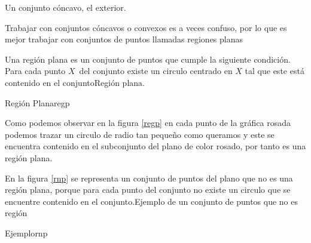 \begin{definicion}
\begin{ejemplo}
{\begin{lista}
\item Un conjunto c\'{o}ncavo, el exterior.
\end{lista}
}
\end{ejemplo}
Trabajar con conjuntos c\'oncavos o convexos es a veces confuso, por lo que es mejor trabajar con conjuntos de puntos llamadas regiones planas
\begin{definicion}{Una regi\'on plana es un conjunto de puntos que cumple la siguiente condici\'on. Para cada punto $X$\ del conjunto existe un circulo centrado en $X$ tal que este est\'a contenido en el conjunto}{Regi\'on plana.}
 \begin{figura}{
 }{Regi\'on Plana}{regp}
 \end{figura}
 Como podemos observar en la figura \ref{regp} en cada punto de la gráfica rosada podemos trazar un circulo de radio tan pequeño como queramos y este se encuentra contenido en el subconjunto del plano de color rosado, por tanto es una región plana.
 \end{definicion}  
 \begin{ejemplo}{En la figura \ref{rnp} se representa un conjunto de puntos del plano que no es una región plana, porque para cada punto del conjunto no existe un circulo que se encuentre contenido en el conjunto.}{Ejemplo de un conjunto de puntos que no es región}
 \begin{figura}
 {
 }{Ejemplo}{rnp}
 \end{figura}
 

\end{ejemplo}
\end{definicion}
